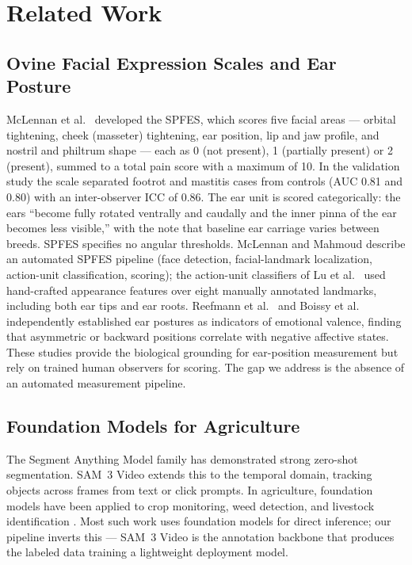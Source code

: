 \documentclass[11pt]{article}
\begin{document}
\section{Related Work}

\subsection{Ovine Facial Expression Scales and Ear Posture}
McLennan et al.\ \citep{mclennan2016} developed the SPFES, which scores five
facial areas --- orbital tightening, cheek (masseter) tightening, ear position,
lip and jaw profile, and nostril and philtrum shape --- each as 0 (not present),
1 (partially present) or 2 (present), summed to a total pain score with a
maximum of 10. In the validation study the scale separated footrot and mastitis
cases from controls (AUC 0.81 and 0.80) with an inter-observer ICC of 0.86. The
ear unit is scored categorically: the ears ``become fully rotated ventrally and
caudally and the inner pinna of the ear becomes less visible,'' with the note
that baseline ear carriage varies between breeds. SPFES specifies no angular
thresholds. McLennan and Mahmoud \citep{mclennan2019} describe an automated
SPFES pipeline (face detection, facial-landmark localization, action-unit
classification, scoring); the action-unit classifiers of Lu et al.\
\citep{lu2017sheepau} used hand-crafted appearance features over eight manually
annotated landmarks, including both ear tips and ear roots. Reefmann et
al.\ \citep{reefmann2009} and Boissy et al.\ \citep{boissy2011} independently
established ear postures as indicators of emotional valence, finding that
asymmetric or backward positions correlate with negative affective states.
These studies provide the biological grounding for ear-position measurement but
rely on trained human observers for scoring. The gap we address is the absence
of an automated measurement pipeline.

\subsection{Foundation Models for Agriculture}
The Segment Anything Model family \citep{kirillov2023segment,ravi2024sam2,ravi2025sam3}
has demonstrated strong zero-shot segmentation. SAM~3 Video extends this to the
temporal domain, tracking objects across frames from text or click prompts. In
agriculture, foundation models have been applied to crop monitoring, weed
detection, and livestock identification \citep{li2024foundation}. Most such work
uses foundation models for direct inference; our pipeline inverts this --- SAM~3
Video is the annotation backbone that produces the labeled data training a
lightweight deployment model.
\end{document}
